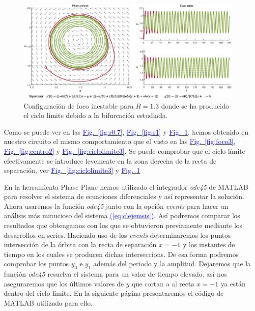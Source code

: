 \documentclass[12pt,a4paper]{report} %
\newcommand{\fref}[1]{\hyperref[#1]{\textcolor{blue}{Fig.~\ref*{#1}}}}
\newcommand{\eref}[1]{\hyperref[#1]{\textcolor{blue}{(\ref*{#1})}}}
\begin{document}
	\newpage
	
	\begin{figure}[h]
		\centering
		\includegraphics[width=1\textwidth]{r1.3.eps}
		\caption{Configuración de foco inestable para $R=1.3$ donde se ha producido el ciclo límite debido a la bifurcación estudiada.}
		\label{fig:r1.3}
	\end{figure}\smallskip
	
	Como se puede ver en las \fref{fig:r0.7}, \fref{fig:r1} y \fref{fig:r1.3}, hemos obtenido en nuestro circuito el mismo comportamiento que el visto en las \fref{fig:foco3}, \fref{fig:centro2} y \fref{fig:ciclolimite3}. Se puede comprobar que el ciclo límite efectivamente se introduce levemente en la zona derecha de la recta de separación, ver \fref{fig:ciclolimite3} y \fref{fig:r1.3}
	
	\vspace{0.5cm} En la herramienta Phase Plane hemos utilizado el integrador \textit{ode45} de MATLAB para resolver el sistema de ecuaciones diferenciales y así representar la solución. Ahora usaremos la función \textit{ode45} junto con la opción \textit{events} para hacer un análisis más minucioso del sistema \eref{eq:clejemsis}. Así podremos comparar los resultados que obtengamos con los que se obtuvieron previamente mediante los desarrollos en series. Haciendo uso de los \textit{events} determinaremos los puntos intersección de la órbita con la recta de separación $x=-1$ y los instantes de tiempo en los cuales se producen dichas interseccions. De esa forma podremos comprobar los puntos $y_0$ e $y_1$ además del periodo y la amplitud. Dejaremos que la función \textit{ode45} resuelva el sistema para un valor de tiempo elevado, así nos aseguraremos que los últimos valores de $y$ que cortan a al recta $x=-1$ ya están dentro del ciclo límite. En la siguiente página presentaremos el código de MATLAB utilizado para ello.
	
	\newpage
	
\end{document}
